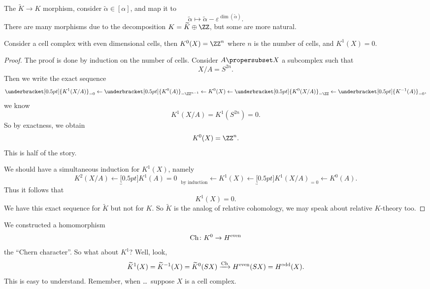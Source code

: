 The $\widetilde{K}\to K$ morphism, consider
$\widetilde{\alpha}\in[\alpha]$, and map it to 
\begin{equation}
\widetilde{\alpha}\mapsto\widetilde{\alpha}-\varepsilon^{\dim(\widetilde{\alpha})}.
\end{equation}
There are many morphisms due to the decomposition
$K=\widetilde{K}\oplus\ZZ$, but some are more natural.

\begin{thm}
Consider a cell complex with even dimensional cells, then
$K^{0}(X)=\ZZ^{n}$ where $n$ is the number of cells, and
$K^{1}(X)=0$.
\end{thm}
\begin{proof}
The proof is done by induction on the number of cells. Consider
$A\propersubset X$ a subcomplex such that 
\begin{equation}
X/A = S^{2n}.
\end{equation}
Then we write the exact sequence
\begin{equation}
\underbracket[0.5pt]{K^{1}(X/A)}_{=0}\gets
\underbracket[0.5pt]{K^{0}(A)}_{=\ZZ^{n-1}}\gets
K^{0}(X)\gets
\underbracket[0.5pt]{K^{0}(X/A)}_{=\ZZ}\gets
\underbracket[0.5pt]{K^{-1}(A)}_{=0},
\end{equation}
we know
\begin{equation}
K^{1}(X/A)=K^{1}(S^{2n})=0.
\end{equation}
So by exactness, we obtain
\begin{equation}
K^{0}(X)=\ZZ^{n}.
\end{equation}
This is half of the story.

We should have a simultaneous induction for $K^{1}(X)$, namely
\begin{equation}
K^{2}(X/A)\gets
\underbracket[0.5pt]{K^{1}(A)=0\;\;}_{\text{by induction}}\!\!\!\gets
K^{1}(X)\gets
\underbracket[0.5pt]{K^{1}(X/A)}_{=0}\gets
K^{0}(A).
\end{equation}
Thus it follows that
\begin{equation}
K^{1}(X)=0.
\end{equation}
We have this exact sequence for $\widetilde{K}$ but not for
$K$. So $\widetilde{K}$ is the analog of relative cohomology, we
may speak about relative $K$-theory too.
\end{proof}

We constructed a homomorphism 
\begin{equation*}
\mathop{\mathrm{Ch}}\nolimits\colon K^{0}\to H^{\text{even}}
\end{equation*}
the ``Chern character''. So what about $K^{1}$? Well, look,
\begin{equation}
\widetilde{K}^{1}(X)=\widetilde{K}^{-1}(X)=\widetilde{K}^{0}(SX)\xrightarrow{\mathop{\mathrm{Ch}}\nolimits}H^{\text{even}}(SX)=H^{\text{odd}}(X).
\end{equation}
This is easy to understand. Remember, when \dots\ suppose $X$ is a
cell complex.

